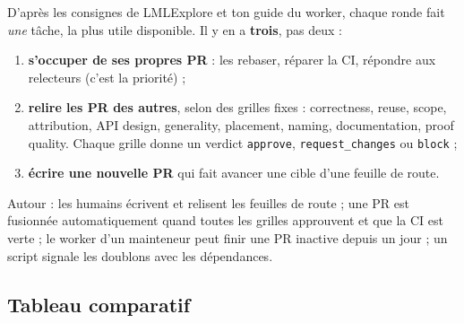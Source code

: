 \documentclass[11pt,a4paper]{article}
\newcommand{\cmd}[1]{\texttt{#1}}
\newcommand{\lmlx}{\textsf{LMLExplore}}
\begin{document}
D'après les consignes de \lmlx{} et ton guide du worker, chaque ronde fait \emph{une} tâche, la plus
utile disponible. Il y en a \textbf{trois}, pas deux :
\begin{enumerate}
\item \textbf{s'occuper de ses propres PR} : les rebaser, réparer la CI, répondre aux relecteurs (c'est
  la priorité) ;
\item \textbf{relire les PR des autres}, selon des grilles fixes : correctness, reuse, scope,
  attribution, API design, generality, placement, naming, documentation, proof quality. Chaque grille
  donne un verdict \cmd{approve}, \cmd{request\_changes} ou \cmd{block} ;
\item \textbf{écrire une nouvelle PR} qui fait avancer une cible d'une feuille de route.
\end{enumerate}
Autour : les humains écrivent et relisent les feuilles de route ; une PR est fusionnée automatiquement
quand toutes les grilles approuvent et que la CI est verte ; le worker d'un mainteneur peut finir une PR
inactive depuis un jour ; un script signale les doublons avec les dépendances.

\subsection{Tableau comparatif}
\end{document}
